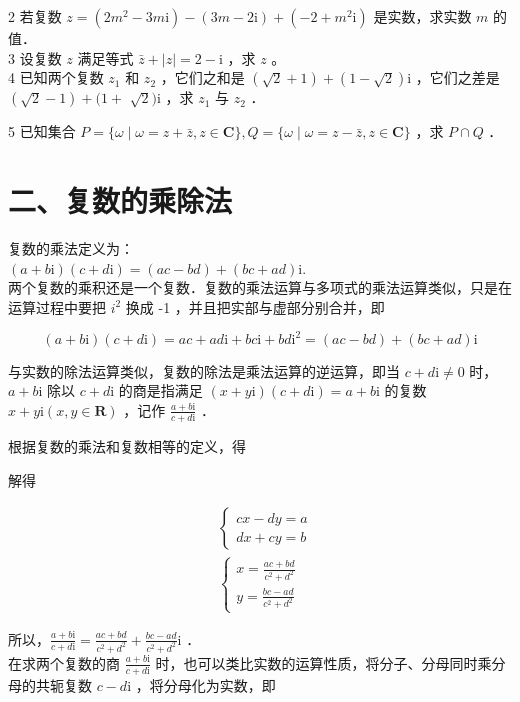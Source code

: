 \documentclass[10pt]{article}
\begin{document}
2 若复数 \(z=\left(2 m^{2}-3 m \mathrm{i}\right)-(3 m-2 \mathrm{i})+\left(-2+m^{2} \mathrm{i}\right)\) 是实数，求实数 \(m\) 的值．\\
3 设复数 \(z\) 满足等式 \(\bar{z}+|z|=2-\mathrm{i}\) ，求 \(z\) 。\\
4 已知两个复数 \(z_{1}\) 和 \(z_{2}\) ，它们之和是 \((\sqrt{2}+1)+(1-\sqrt{2}) \mathrm{i}\) ，它们之差是 \((\sqrt{2}-1)+(1+\) \(\sqrt{2}) \mathrm{i}\) ，求 \(z_{1}\) 与 \(z_{2}\) ．

5 已知集合 \(P=\{\omega \mid \omega=z+\bar{z}, z \in \mathbf{C}\}, Q=\{\omega \mid \omega=z-\bar{z}, z \in \mathbf{C}\}\) ，求 \(P \cap Q\) ．

\section*{二、复数的乘除法}
复数的乘法定义为：\\
\((a+b \mathrm{i})(c+d \mathrm{i})=(a c-b d)+(b c+a d) \mathrm{i}\).\\
两个复数的乘积还是一个复数．复数的乘法运算与多项式的乘法运算类似，只是在运算过程中要把 \(i^{2}\) 换成 -1 ，并且把实部与虚部分别合并，即

\[
(a+b \mathrm{i})(c+d \mathrm{i})=a c+a d \mathrm{i}+b c \mathrm{i}+b d \mathrm{i}^{2}=(a c-b d)+(b c+a d) \mathrm{i}
\]

与实数的除法运算类似，复数的除法是乘法运算的逆运算，即当 \(c+d \mathrm{i} \neq 0\) 时，\(a+b \mathrm{i}\) 除以 \(c+d \mathrm{i}\) 的商是指满足 \((x+y \mathrm{i})(c+d \mathrm{i})=a+b \mathrm{i}\) 的复数 \(x+y \mathrm{i}(x, y \in \mathbf{R})\) ，记作 \(\frac{a+b \mathrm{i}}{c+d \mathrm{i}}\) ．

根据复数的乘法和复数相等的定义，得

解得

\[
\begin{aligned}
& \left\{\begin{array}{l}
c x-d y=a \\
d x+c y=b
\end{array}\right. \\
& \left\{\begin{array}{l}
x=\frac{a c+b d}{c^{2}+d^{2}} \\
y=\frac{b c-a d}{c^{2}+d^{2}}
\end{array}\right.
\end{aligned}
\]

所以，\(\frac{a+b \mathrm{i}}{c+d \mathrm{i}}=\frac{a c+b d}{c^{2}+d^{2}}+\frac{b c-a d}{c^{2}+d^{2}} \mathrm{i}\) ．\\
在求两个复数的商 \(\frac{a+b \mathrm{i}}{c+d \mathrm{i}}\) 时，也可以类比实数的运算性质，将分子、分母同时乘分母的共轭复数 \(c-d \mathrm{i}\) ，将分母化为实数，即
\end{document}

